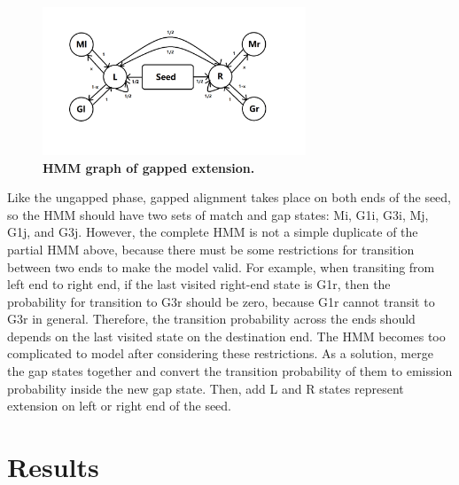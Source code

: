 \documentclass[12pt]{article}
\begin{document}
    \begin{figure}[!htb]
        \centering
		\includegraphics[width=0.7\textwidth,trim={0.5cm 5cm 3cm 0.5cm},clip]{fig5} %
		\caption{\textbf{HMM graph of gapped extension.}}
		\label{fig:gappedHMMGraph}
	\end{figure}
Like the ungapped phase, gapped alignment takes place on both ends of the seed, so the HMM should have two sets of match and gap states: Mi, G1i, G3i, Mj, G1j, and G3j. However, the complete HMM is not a simple duplicate of the partial HMM above, because there must be some restrictions for transition between two ends to make the model valid. For example, when transiting from left end to right end, if the last visited right-end state is G1r, then the probability for transition to G3r should be zero, because G1r cannot transit to G3r in general. Therefore, the transition probability across the ends should depends on the last visited state on the destination end. The HMM becomes too complicated to model after considering these restrictions. As a solution, merge the gap states together and convert the transition probability of them to emission probability inside the new gap state. Then, add L and R states represent extension on left or right end of the seed.



\label{Results}
\section{Results}
\end{document}
